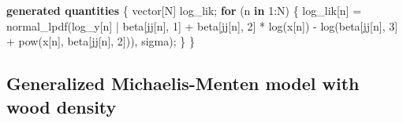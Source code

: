 \documentclass[
  12pt,
  letterpaper,
  DIV=11,
  numbers=noendperiod]{scrartcl}
\newenvironment{Shaded}{\begin{snugshade}}{\end{snugshade}}
\newcommand{\ControlFlowTok}[1]{\textcolor[rgb]{0.00,0.23,0.31}{\textbf{#1}}}
\newcommand{\DataTypeTok}[1]{\textcolor[rgb]{0.68,0.00,0.00}{#1}}
\newcommand{\DecValTok}[1]{\textcolor[rgb]{0.68,0.00,0.00}{#1}}
\newcommand{\KeywordTok}[1]{\textcolor[rgb]{0.00,0.23,0.31}{\textbf{#1}}}
\newcommand{\NormalTok}[1]{\textcolor[rgb]{0.00,0.23,0.31}{#1}}
\begin{document}
\begin{Shaded}
\begin{Highlighting}[]
\KeywordTok{generated quantities}\NormalTok{ \{}
  \DataTypeTok{vector}\NormalTok{[N] log\_lik;}
  \ControlFlowTok{for}\NormalTok{ (n }\ControlFlowTok{in} \DecValTok{1}\NormalTok{:N) \{}
\NormalTok{    log\_lik[n] = normal\_lpdf(log\_y[n] |}
\NormalTok{      beta[jj[n], }\DecValTok{1}\NormalTok{] +}
\NormalTok{      beta[jj[n], }\DecValTok{2}\NormalTok{] * log(x[n]) {-}}
\NormalTok{      log(beta[jj[n], }\DecValTok{3}\NormalTok{] + pow(x[n], beta[jj[n], }\DecValTok{2}\NormalTok{])),}
\NormalTok{      sigma);}
\NormalTok{  \}}
\NormalTok{\}}
\end{Highlighting}
\end{Shaded}

\newpage

\subsection{Generalized Michaelis-Menten model with wood
density}\label{generalized-michaelis-menten-model-with-wood-density}
\end{document}

